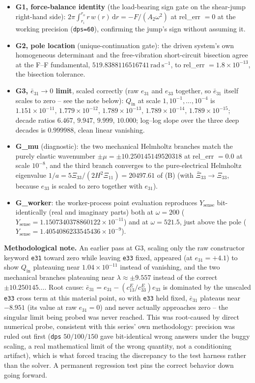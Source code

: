 \documentclass[11pt]{article}
\newcommand{\eebar}{\bar{e}_{31}}
\newcommand{\Xibar}{\bar{\Xi}_{33}}
\begin{document}
\begin{itemize}
\item \textbf{G1, force-balance identity} (the load-bearing sign gate on
the shear-jump right-hand side):
$2\pi\int_{r_i}^{r_o}r\,w(r)\,\mathrm dr=-F/(A_2\omega^2)$ at
rel\_err $=0$ at the working precision (\texttt{dps=60}),
confirming the jump's sign without assuming it.
\item \textbf{G2, pole location} (unique-continuation gate): the driven
system's own homogeneous determinant and the free-vibration
short-circuit bisection agree at the F--F fundamental,
$519.8388116516741\,\mathrm{rad\,s^{-1}}$, to rel\_err
$=1.8\times10^{-13}$, the bisection tolerance.
\item \textbf{G3, $\eebar\to0$ limit}, scaled correctly (raw $e_{31}$
and $e_{33}$ together, so $\eebar$ itself scales to zero -- see the note
below): $Q_{\mathrm{in}}$ at scale $1,10^{-1},\ldots,10^{-4}$ is
$1.151\times10^{-11}$, $1.779\times10^{-12}$, $1.789\times10^{-13}$,
$1.789\times10^{-14}$, $1.789\times10^{-15}$; decade ratios $6.467$,
$9.947$, $9.999$, $10.000$; log--log slope over the three deep decades
is $0.999988$, clean linear vanishing.
\item \textbf{G\_mu} (diagnostic): the two mechanical Helmholtz branches
match the purely elastic wavenumber $\pm\mu=\pm10.250145149520318$ at
rel\_err $=0.0$ at scale $10^{-8}$, and the third branch converges to
the pure-electrical Helmholtz eigenvalue $1/a=5\Xi_{33}/(2H^2\Xi_{11})
=20497.61$ of (B) (with $\Xibar\to\Xi_{33}$, because $e_{33}$ is scaled
to zero together with $e_{31}$).
\item \textbf{G\_worker}: the worker-process point evaluation reproduces
$Y_{\mathrm{sense}}$ bit-identically (real and imaginary parts) both at
$\omega=200$ ($Y_{\mathrm{sense}}=1.1507340378860122\times10^{-11}$) and
at $\omega=521.5$, just above the pole
($Y_{\mathrm{sense}}=1.4054086233545436\times10^{-9}$).
\end{itemize}

\textbf{Methodological note.} An earlier pass at G3, scaling only the
raw constructor keyword \texttt{e31} toward zero while leaving
\texttt{e33} fixed, appeared (at $e_{31}=+4.1$) to show $Q_{\mathrm{in}}$
plateauing near $1.04\times10^{-11}$ instead of vanishing, and the two mechanical
branches plateauing near $\lambda\approx\pm9.557$ instead of the
correct $\pm10.250145\ldots$. Root cause: $\eebar=e_{31}
-(c_{13}^E/c_{33}^E)e_{33}$ is dominated by the unscaled \texttt{e33}
cross term at this material point, so with \texttt{e33} held fixed,
$\eebar$ plateaus near $-8.951$ (its value at raw $e_{31}=0$) and never
actually approaches zero -- the singular limit being probed was never
reached. This was root-caused by direct numerical probe, consistent with
this series' own methodology: precision was ruled out first (\texttt{dps}
$50/100/150$ gave bit-identical wrong answers under the buggy scaling,
a real mathematical limit of the wrong quantity, not a conditioning
artifact), which is what forced tracing the discrepancy to the test
harness rather than the solver. A permanent regression test pins the
correct behavior down going forward.
\end{document}
